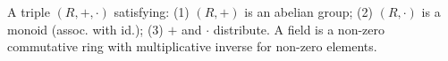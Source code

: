  A triple $(R, +, \cdot)$ satisfying:
(1) $(R, +)$ is an abelian group;
(2) $(R, \cdot)$ is a monoid (assoc. with id.);
(3) $+$ and $\cdot$ distribute.
 A field is a non-zero commutative ring with multiplicative inverse for non-zero elements.
